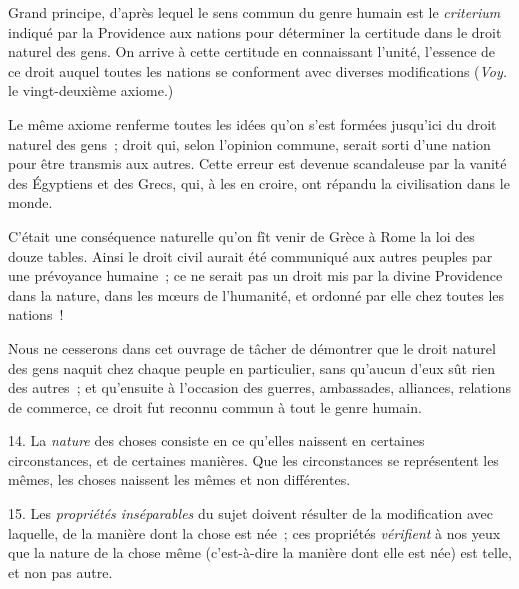 \documentclass[french,twoside]{book} %
\begin{document}
Grand principe, d’après lequel le sens commun du genre humain est le {\itshape criterium} indiqué par la Providence aux nations pour déterminer la certitude dans le droit naturel des gens. On arrive à cette certitude en connaissant l’unité, l’essence de ce droit auquel toutes les nations se conforment avec diverses modifications ({\itshape Voy.} le vingt-deuxième axiome.)\par
Le même axiome renferme toutes les idées qu’on s’est formées jusqu’ici du droit naturel des gens ; droit qui, selon l’opinion commune, serait sorti d’une nation pour être transmis aux autres. Cette erreur est devenue scandaleuse par la vanité des Égyptiens et des Grecs, qui, à les en croire, ont répandu la civilisation dans le monde.\par
C’était une conséquence naturelle qu’on fît venir de Grèce à Rome la loi des douze tables. Ainsi le droit civil aurait été communiqué aux autres peuples par une prévoyance humaine ; ce ne serait pas un droit mis par la divine Providence dans la nature, dans les mœurs de l’humanité, et ordonné par elle chez toutes les nations !\par
Nous ne cesserons dans cet ouvrage de tâcher de  démontrer que le droit naturel des gens naquit chez chaque peuple en particulier, sans qu’aucun d’eux sût rien des autres ; et qu’ensuite à l’occasion des guerres, ambassades, alliances, relations de commerce, ce droit fut reconnu commun à tout le genre humain.\par
14. La {\itshape nature} des choses consiste en ce qu’elles naissent en certaines circonstances, et de certaines manières. Que les circonstances se représentent les mêmes, les choses naissent les mêmes et non différentes.\par
15. Les {\itshape propriétés inséparables} du sujet doivent résulter de la modification avec laquelle, de la manière dont la chose est née ; ces propriétés {\itshape vérifient} à nos yeux que la nature de la chose même (c’est-à-dire la manière dont elle est née) est telle, et non pas autre.
\end{document}

